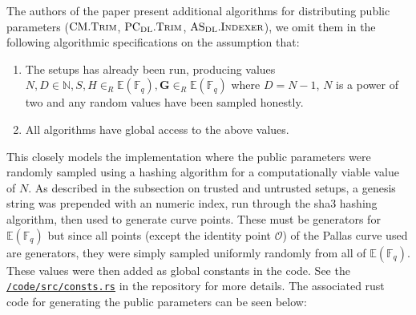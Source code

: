 \documentclass[
]{article}
\providecommand{\tightlist}{%
  \setlength{\itemsep}{0pt}\setlength{\parskip}{0pt}}
\newcommand*\Fb{\mathbb{F}}
\newcommand*\Nb{\mathbb{N}}
\newcommand*\Eb{\mathbb{E}}
\newcommand*\Oc{\mathcal{O}}
\renewcommand{\vec}[1]{ \boldsymbol{#1} }
\newcommand*{\Trim}{\mathrm{\text{T{\scriptsize RIM}}}}
\newcommand*{\PCDL}{\text{PC}_{\text{DL}}}
\newcommand*{\PCDLTrim}{\PCDL.\Trim}
\newcommand*{\ASDL}{\text{AS}_{\text{DL}}}
\newcommand*{\ASDLIndexer}{\ASDL.\mathrm{\text{I\scriptsize NDEXER}}}
\newcommand*{\CM}{\mathrm{\text{CM}}}
\newcommand*{\CMTrim}{\CM.\Trim}
\begin{document}
The authors of the paper present additional algorithms for distributing
public parameters (\(\CMTrim\), \(\PCDLTrim\), \(\ASDLIndexer\)), we
omit them in the following algorithmic specifications on the assumption
that:

\begin{enumerate}
\def\labelenumi{\alph{enumi}.}
\tightlist
\item
  The setups has already been run, producing values
  \(N, D \in \Nb, S, H \in_R
  \Eb(\Fb_q), \vec{G} \in_R \Eb(\Fb_q)\) where \(D = N - 1\), \(N\) is a
  power of two and any random values have been sampled honestly.
\item
  All algorithms have global access to the above values.
\end{enumerate}

This closely models the implementation where the public parameters were
randomly sampled using a hashing algorithm for a computationally viable
value of \(N\). As described in the subsection on trusted and untrusted
setups, a genesis string was prepended with an numeric index, run
through the sha3 hashing algorithm, then used to generate curve points.
These must be generators for \(\Eb(\Fb_q)\) but since all points (except
the identity point \(\Oc\)) of the Pallas curve used are generators,
they were simply sampled uniformly randomly from all of \(\Eb(\Fb_q)\).
These values were then added as global constants in the code. See the
\href{https://github.com/rasmus-kirk/halo-accumulation/blob/main/code/src/consts.rs}{\texttt{/code/src/consts.rs}}
in the repository for more details. The associated rust code for
generating the public parameters can be seen below:
\end{document}
